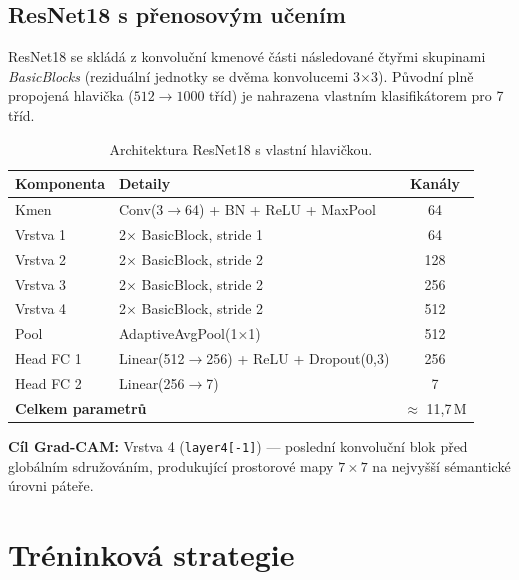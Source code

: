 \documentclass[12pt, a4paper]{article}
\begin{document}
\subsection{ResNet18 s přenosovým učením}

ResNet18 se skládá z konvoluční kmenové části
následované čtyřmi skupinami \textit{BasicBlocks} (reziduální jednotky
se dvěma konvolucemi 3$\times$3). Původní plně propojená hlavička
($512 \to 1000$ tříd) je nahrazena vlastním klasifikátorem pro 7 tříd.

\begin{table}[H]
    \centering
    \caption{Architektura ResNet18 s vlastní hlavičkou.}
    \begin{tabular}{llc}
        \toprule
        \textbf{Komponenta} & \textbf{Detaily} & \textbf{Kanály} \\
        \midrule
        Kmen      & Conv(3$\to$64) + BN + ReLU + MaxPool & 64 \\
        Vrstva 1  & 2$\times$ BasicBlock, stride 1 & 64 \\
        Vrstva 2  & 2$\times$ BasicBlock, stride 2 & 128 \\
        Vrstva 3  & 2$\times$ BasicBlock, stride 2 & 256 \\
        Vrstva 4  & 2$\times$ BasicBlock, stride 2 & 512 \\
        Pool      & AdaptiveAvgPool(1$\times$1) & 512 \\
        \midrule
        Head FC 1 & Linear(512$\to$256) + ReLU + Dropout(0{,}3) & 256 \\
        Head FC 2 & Linear(256$\to$7) & 7 \\
        \midrule
        \multicolumn{2}{l}{\textbf{Celkem parametrů}} & $\approx$ 11{,}7\,M \\
        \bottomrule
    \end{tabular}
    \label{tab:resnet_arch}
\end{table}

\textbf{Cíl Grad-CAM:} Vrstva 4 (\texttt{layer4[-1]}) --- poslední
konvoluční blok před globálním sdružováním, produkující prostorové mapy
$7\times7$ na nejvyšší sémantické úrovni páteře.

\section{Tréninková strategie}
\label{sec:training}
\end{document}
